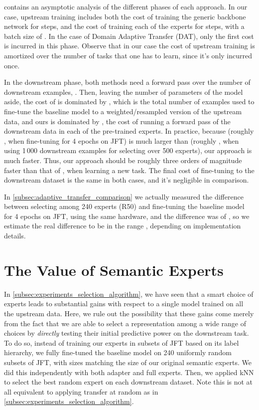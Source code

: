 \documentclass{article}
\newcommand{\JFT}{{JFT}\xspace}
\begin{document}
 contains an asymptotic 
analysis of the different phases of each approach. In our case,
upstream training includes both the cost of training the generic 
backbone network for  steps, 
and the cost of training each of the  experts for  steps,
with a batch size of .
In the case of Domain Adaptive Transfer (DAT), only the first cost
is incurred in this phase.
Observe that in our case the cost of upstream training is 
amortized over the number of tasks that one has to learn, 
since it's only incurred once. 

In the downstream phase, both methods need a forward pass over the
number of downstream examples, . Then, leaving the number 
of parameters of the model aside, the cost of \cite{ngiam2018domain} 
is dominated by , which is the total number of examples 
used to fine-tune the baseline model to a weighted/resampled version 
of the upstream data, and ours is dominated by , the cost 
of running a forward pass of the downstream data in each of the 
pre-trained experts.
In practice, because  (roughly , when 
fine-tuning for 4 epochs on \JFT) is much larger than  
(roughly , when using 1\,000 downstream examples for 
selecting over 500 experts), our approach is much faster.
Thus, our approach should be roughly three orders of magnitude 
faster than that of \cite{ngiam2018domain}, when learning a new task.
The final cost of fine-tuning to the downstream dataset is the same
in both cases, and it's negligible in comparison.

In \cref{subsec:adaptive_transfer_comparison} we actually measured 
the difference between selecting among 240 experts (R50) and 
fine-tuning the baseline model for 4 epochs on \JFT, using the same
hardware, and the difference was of , so we estimate 
the real difference to be in the range , 
depending on implementation details. \section{The Value of Semantic Experts}
\label{app:random_experts}

In \cref{subsec:experiments_selection_algorithm}, we have seen that a smart choice of experts leads to substantial gains with respect to 
a single model trained on all the upstream data. 
Here, we rule out the possibility that these gains come merely from the fact that we are able 
to select a representation among a wide range of choices by \emph{directly} testing their 
initial predictive power on the downstream task.
To do so, instead of training our experts in subsets of \JFT based on its label hierarchy,
we fully fine-tuned the baseline model on 240 uniformly random subsets of \JFT, 
with sizes matching the size of our original semantic experts.
We did this independently with both adapter and full experts.
Then, we applied kNN to select the best random expert on each downstream dataset.
Note this is not at all equivalent to applying transfer at random as in \cref{subsec:experiments_selection_algorithm}.
\end{document}
